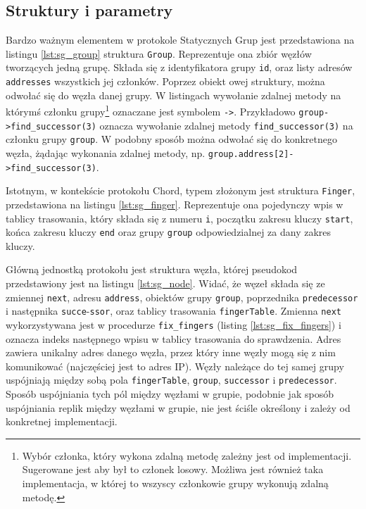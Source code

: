 \documentclass[12pt, twoside, openany]{report}
\begin{document}
\subsection{Struktury i parametry}

Bardzo ważnym elementem w protokole Statycznych Grup jest przedstawiona na listingu \ref{lst:sg_group} struktura \texttt{Group}. Reprezentuje ona zbiór węzłów tworzących jedną grupę. Składa się z identyfikatora grupy \texttt{id}, oraz listy adresów \texttt{addresses} wszystkich jej członków. Poprzez obiekt owej struktury, można odwołać się do węzła danej grupy. W listingach wywołanie zdalnej metody na którymś członku grupy\footnote{Wybór członka, który wykona zdalną metodę zależny jest od implementacji. Sugerowane jest aby był to członek losowy. Możliwa jest również taka implementacja, w której to wszyscy członkowie grupy wykonują zdalną metodę.} oznaczane jest symbolem \texttt{->}. Przykładowo \texttt{group->find\_successor(3)} oznacza wywołanie zdalnej metody \texttt{find\_successor(3)} na członku grupy \texttt{group}. W podobny sposób można odwołać się do konkretnego węzła, żądając wykonania zdalnej metody, np. \texttt{group.address[2]->find\_successor(3)}.

Istotnym, w kontekście protokołu Chord, typem złożonym jest struktura \texttt{Finger}, przedstawiona na listingu \ref{lst:sg_finger}. Reprezentuje ona pojedynczy wpis w tablicy trasowania, który składa się z numeru \texttt{i}, początku zakresu kluczy \texttt{start}, końca zakresu kluczy \texttt{end} oraz grupy \texttt{group} odpowiedzialnej za dany zakres kluczy.







Główną jednostką protokołu jest struktura węzła, której pseudokod przedstawiony jest na listingu \ref{lst:sg_node}. Widać, że węzeł składa się ze zmiennej \texttt{next}, adresu \texttt{address}, obiektów grupy \texttt{group}, poprzednika \texttt{predecessor} i następnika \texttt{succe}-\texttt{ssor}, oraz tablicy trasowania \texttt{fingerTable}. Zmienna \texttt{next} wykorzystywana jest w procedurze \texttt{fix\_fingers} (listing \ref{lst:sg_fix_fingers}) i oznacza indeks następnego wpisu w tablicy trasowania do sprawdzenia. Adres zawiera unikalny adres danego węzła, przez który inne węzły mogą się z nim komunikować (najczęściej jest to adres IP). Węzły należące do tej samej grupy uspójniają między sobą pola \texttt{fingerTable}, \texttt{group}, \texttt{successor} i \texttt{predecessor}. Sposób uspójniania tych pól między węzłami w grupie, podobnie jak sposób uspójniania replik między węzłami w grupie, nie jest ściśle określony i zależy od konkretnej implementacji.
\end{document}
